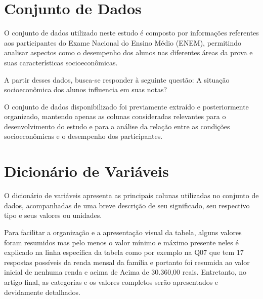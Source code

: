 \documentclass{article}
\begin{document}
\section{Conjunto de Dados}

O conjunto de dados utilizado neste estudo é composto por informações referentes aos participantes do Exame Nacional do Ensino Médio (ENEM), permitindo analisar aspectos como o desempenho dos alunos nas diferentes áreas da prova e suas características socioeconômicas.

A partir desses dados, busca-se responder à seguinte questão: A situação socioeconômica dos alunos influencia em suas notas?

O conjunto de dados disponibilizado foi previamente extraído e posteriormente organizado, mantendo apenas as colunas consideradas relevantes para o desenvolvimento do estudo e para a análise da relação entre as condições socioeconômicas e o desempenho dos participantes.

\section{Dicionário de Variáveis}

O dicionário de variáveis apresenta as principais colunas utilizadas no conjunto de dados, acompanhadas de uma breve descrição de seu significado, seu respectivo tipo e seus valores ou unidades.

Para facilitar a organização e a apresentação visual da tabela, alguns valores foram resumidos mas pelo menos o valor mínimo e máximo presente neles é explicado na linha específica da tabela como por exemplo na Q07 que tem 17 respostas possíveis da renda mensal da família e portanto foi resumida ao valor inicial de nenhuma renda e acima de Acima de 30.360,00 reais. Entretanto, no artigo final, as categorias e os valores completos serão apresentados e devidamente detalhados.
\end{document}
